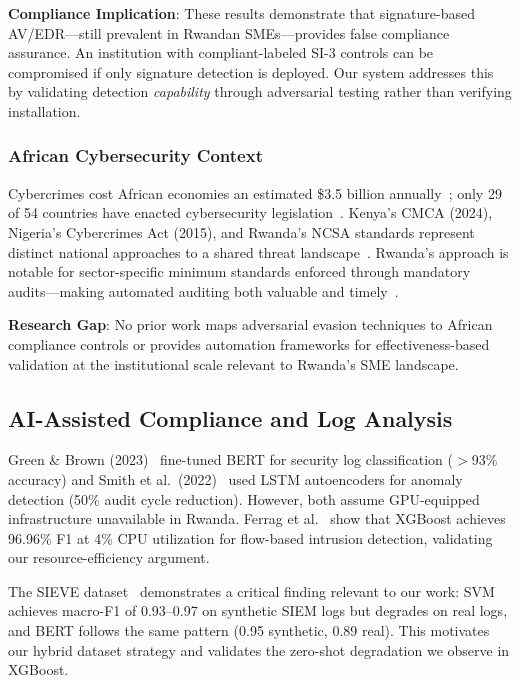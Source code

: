\documentclass[futureinternet,article,submit,pdftex,moreauthors]{Definitions/mdpi}
\begin{document}
\textbf{Compliance Implication}: These results demonstrate that signature-based AV/EDR---still
prevalent in Rwandan SMEs---provides false compliance assurance. An institution with
compliant-labeled SI-3 controls can be compromised if only signature detection is deployed.
Our system addresses this by validating detection \textit{capability} through adversarial
testing rather than verifying installation.

\subsubsection{African Cybersecurity Context}

Cybercrimes cost African economies an estimated \$3.5 billion
annually~\cite{serianu_africa}; only 29 of 54 countries have enacted cybersecurity
legislation~\cite{itu_africa_cyber}. Kenya's CMCA (2024), Nigeria's Cybercrimes Act (2015),
and Rwanda's NCSA standards represent distinct national approaches to a shared threat
landscape~\cite{kenya_cyber_law,nigeria_cyber,ncsa2023}. Rwanda's approach is notable for
sector-specific minimum standards enforced through mandatory audits---making automated
auditing both valuable and timely~\cite{rwanda_strategy_2024}.

\textbf{Research Gap}: No prior work maps adversarial evasion techniques to African compliance
controls or provides automation frameworks for effectiveness-based validation at the
institutional scale relevant to Rwanda's SME landscape.

\subsection{AI-Assisted Compliance and Log Analysis}

Green \& Brown (2023)~\cite{bert_audit} fine-tuned BERT for security log classification
($>$93\% accuracy) and Smith et al.\ (2022)~\cite{lstm_audit} used LSTM autoencoders for
anomaly detection (50\% audit cycle reduction). However, both assume GPU-equipped
infrastructure unavailable in Rwanda. Ferrag et al.~\cite{ferrag2025} show that XGBoost
achieves 96.96\% F1 at 4\% CPU utilization for flow-based intrusion detection, validating
our resource-efficiency argument.

The SIEVE dataset~\cite{sieve_dataset} demonstrates a critical finding relevant to our work:
SVM achieves macro-F1 of 0.93--0.97 on synthetic SIEM logs but degrades on real logs, and
BERT follows the same pattern (0.95 synthetic, 0.89 real). This motivates our hybrid dataset
strategy and validates the zero-shot degradation we observe in XGBoost.
\end{document}
